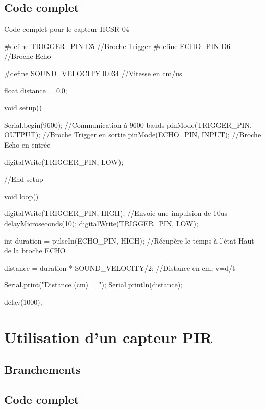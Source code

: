 \subsection{Code complet}

\begin{Cpp}{Code complet pour le capteur HCSR-04}

#define TRIGGER_PIN D5  //Broche Trigger
#define ECHO_PIN D6     //Broche Echo

#define SOUND_VELOCITY 0.034 //Vitesse en cm/us

float distance = 0.0;

void setup() {

  Serial.begin(9600);         //Communication à 9600 bauds
  pinMode(TRIGGER_PIN, OUTPUT); //Broche Trigger en sortie
  pinMode(ECHO_PIN, INPUT);     //Broche Echo en entrée

  digitalWrite(TRIGGER_PIN, LOW);

}//End setup

void loop() {

  digitalWrite(TRIGGER_PIN, HIGH); //Envoie une impulsion de 10us
  delayMicroseconds(10);
  digitalWrite(TRIGGER_PIN, LOW);
  
  int duration = pulseIn(ECHO_PIN, HIGH); //Récupère le temps à l'état Haut de la broche ECHO

  distance = duration * SOUND_VELOCITY/2; //Distance en cm, v=d/t

  Serial.print("Distance (cm) = ");
  Serial.println(distance);
  
  delay(1000);
}

\end{Cpp}


\section{Utilisation d'un capteur PIR}

\subsection{Branchements}


\subsection{Code complet}

